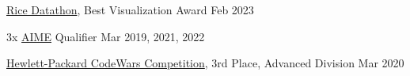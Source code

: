 \href{https://rice-datathon-2023.devpost.com/}{Rice Datathon}, Best Visualization Award \hfill Feb 2023 \par
3x \href{https://www.maa.org/math-competitions/american-invitational-mathematics-examination-aime}{AIME} Qualifier \hfill Mar 2019, 2021, 2022\par
\href{https://hpecodewars.org/api/Files/events/2020/2020WinnersHouston.pdf}{Hewlett-Packard CodeWars Competition}, 3rd Place, Advanced Division \hfill Mar 2020\par